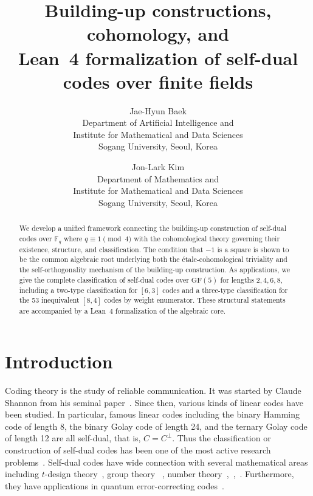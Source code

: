 \documentclass[12pt]{article}
\newcommand{\F}{\mathbb{F}}
\newcommand{\GF}[1]{\ensuremath{\mathrm{GF}(#1)}}
\begin{document}
\title{Building-up constructions, cohomology, and \\ Lean~4 formalization of self-dual codes over finite fields}

\author{
Jae-Hyun Baek \\
Department of Artificial Intelligence and \\
Institute for Mathematical and Data Sciences \\
Sogang University, Seoul, Korea
\and
Jon-Lark Kim\\
Department of Mathematics and\\
Institute for Mathematical and Data Sciences \\
Sogang University, Seoul, Korea
}

\maketitle

\begin{abstract}
We develop a unified framework connecting the building-up construction of self-dual codes over $\F_q$ where $q \equiv 1 \pmod{4}$ with the cohomological theory governing their existence, structure, and classification.
The condition that $-1$ is a square is shown to be the common algebraic root underlying both the \'etale-cohomological triviality and the self-orthogonality mechanism of the building-up construction.
As applications, we give the complete classification of self-dual codes over $\GF{5}$ for lengths $2, 4, 6, 8$, including a two-type classification for $[6,3]$ codes and a three-type classification for the 53 inequivalent $[8,4]$ codes by weight enumerator. These structural statements are accompanied by a Lean~4 formalization of the algebraic core.
\end{abstract}




\section{Introduction}
\label{sec:intro}

Coding theory is the study of reliable communication. It was started by Claude Shannon from his seminal paper~\cite{Sha}. Since then,
various kinds of linear codes have been studied. In particular, famous linear codes including the binary Hamming code of length 8, the binary Golay code of length 24, and the ternary Golay code of length 12 are all self-dual, that is, $C = C^{\perp}$.
Thus the classification or construction of self-dual codes has been one of the most active research problems~\cite{self-dual}.
Self-dual codes have wide connection with several mathematical areas including $t$-design theory~\cite{BacGab}, group theory
~\cite{ConSlo}, number theory~\cite{BaDou},~\cite{ConSlo},~\cite{ShiChoShaSol}. Furthermore, they have applications in quantum error-correcting codes~\cite{CRSS}.
\end{document}

